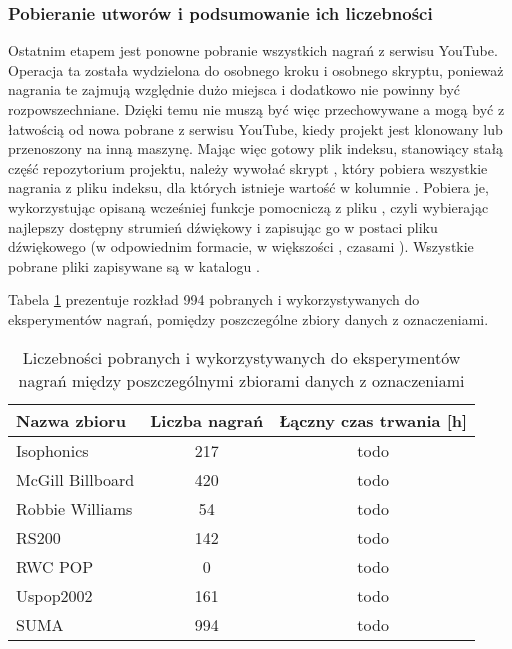 \subsubsection{Pobieranie utworów i podsumowanie ich liczebności}
Ostatnim etapem jest ponowne pobranie wszystkich nagrań z serwisu YouTube. Operacja ta została
wydzielona do osobnego kroku i osobnego skryptu, ponieważ nagrania te zajmują względnie dużo miejsca
i dodatkowo nie powinny być rozpowszechniane. Dzięki temu nie muszą być więc przechowywane a mogą
być z łatwością od nowa pobrane z serwisu YouTube, kiedy projekt jest klonowany lub przenoszony na
inną maszynę. Mając więc gotowy plik indeksu, stanowiący stałą część repozytorium projektu, należy
wywołać skrypt , który pobiera wszystkie nagrania z
pliku indeksu, dla których istnieje wartość w kolumnie . Pobiera je, wykorzystując
opisaną wcześniej funkcje pomocniczą z pliku , czyli
wybierając najlepszy dostępny strumień dźwiękowy i zapisując go w postaci pliku dźwiękowego (w
odpowiednim formacie, w większości , czasami ). Wszystkie pobrane pliki
zapisywane są w katalogu .

Tabela \ref{tab:datasets2} prezentuje rozkład 994 pobranych i wykorzystywanych do eksperymentów
nagrań, pomiędzy poszczególne zbiory danych z oznaczeniami.

\begin{table}
    \centering
    \caption{Liczebności pobranych i wykorzystywanych do eksperymentów nagrań między poszczególnymi zbiorami danych z oznaczeniami}
    \label{tab:datasets2}
    \begin{tabular}{|l|c|c|}
        \hline
        Nazwa zbioru & Liczba nagrań & Łączny czas trwania [h] \\
        \hline
        Isophonics          & 217 & todo \\
        McGill Billboard    & 420 & todo \\
        Robbie Williams     & 54 & todo \\
        RS200               & 142 & todo \\
        RWC POP             & 0 & todo \\
        Uspop2002           & 161 & todo \\
        \hline
        SUMA                & 994 & todo \\
        \hline
    \end{tabular}
\end{table}

